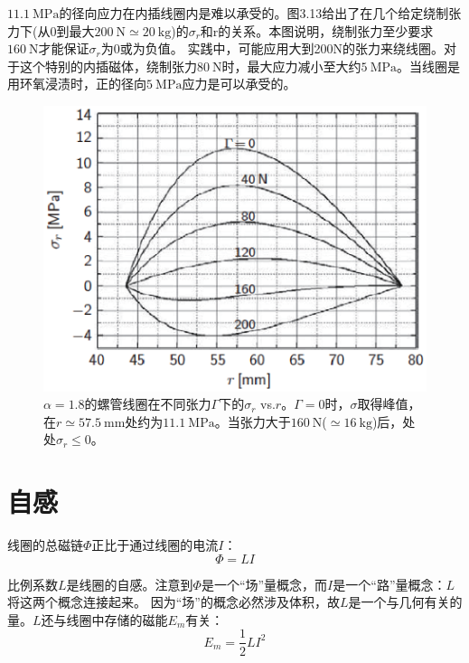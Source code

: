 $11.1\ \mathrm{MPa}$的径向应力在内插线圈内是难以承受的。图3.13给出了在几个给定绕制张力下(从0到最大$200\ \mathrm{N}\simeq 20\ \mathrm{kg}$)的$\sigma_{r}$和r的关系。本图说明，绕制张力至少要求$160\ \mathrm{N}$才能保证$\sigma_{r}$为0或为负值。
实践中，可能应用大到200N的张力来绕线圈。对于这个特别的内插磁体，绕制张力$80\ \mathrm{N}$时，最大应力减小至大约$5\ \mathrm{MPa}$。当线圈是用环氧浸渍时，正的径向$5\ \mathrm{MPa}$应力是可以承受的。
\begin{figure}[htbp]
  \centering
 \includegraphics[scale=0.7]{chpt3/figs/fig3.13.eps}
  \caption{$\alpha=1.8$的螺管线圈在不同张力$\Gamma$下的$\sigma_r$ vs.$r$。$\Gamma=0$时，$\sigma$取得峰值，在$r\simeq 57.5\ \mathrm{mm}$处约为$11.1\ \mathrm{MPa}$。当张力大于$160\ \mathrm{N}$($\simeq 16\ \mathrm{kg}$)后，处处$\sigma_r\le 0 $。}
\end{figure}




\section{自感}
线圈的总磁链$\Phi$正比于通过线圈的电流$I$：
\begin{equation}
 \Phi=LI %
\end{equation}

比例系数$L$是线圈的自感。注意到$\Phi$是一个“场”量概念，而$I$是一个“路”量概念：$L$将这两个概念连接起来。
因为“场”的概念必然涉及体积，故$L$是一个与几何有关的量。$L$还与线圈中存储的磁能$E_m$有关：
\begin{equation}
 E_m=\frac{1}{2}LI^2 %
\end{equation}

